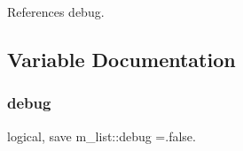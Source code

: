 References debug.



\subsection{Variable Documentation}
\mbox{\label{namespacem__list_aaa3ea916cd8c669ebbc8ec9096c5bbca}} 
\subsubsection{\texorpdfstring{debug}{debug}}
{\footnotesize\ttfamily logical, save m\+\_\+list\+::debug =.false.\hspace{0.3cm}{\ttfamily [private]}}

